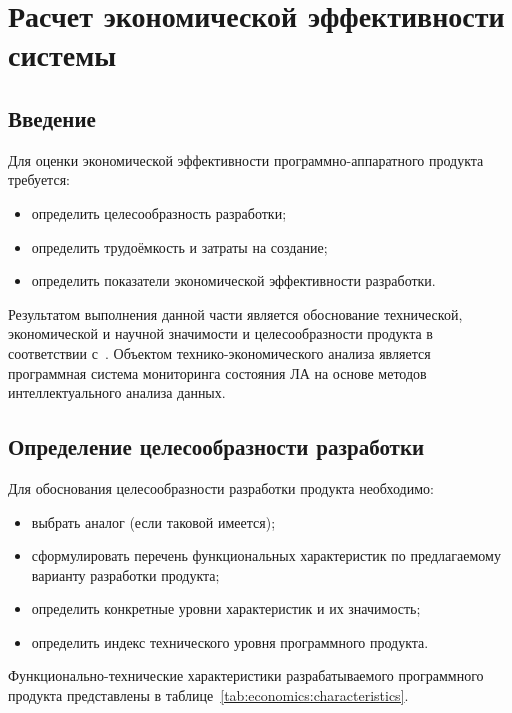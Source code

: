 \chapter{Расчет экономической эффективности системы}
\section{Введение}
Для оценки экономической эффективности программно-аппаратного продукта требуется:
\begin{itemize}
\item определить целесообразность разработки;
\item определить трудоёмкость и затраты на создание;
\item определить показатели экономической эффективности разработки.
\end{itemize}

Результатом выполнения данной части является обоснование технической, экономической и научной значимости и целесообразности продукта в соответствии с~\cite{EconomicsMethodic}. Объектом технико-экономического анализа является программная система мониторинга состояния ЛА на основе методов интеллектуального анализа данных.

\section{Определение целесообразности разработки}
Для обоснования целесообразности разработки продукта необходимо:
\begin{itemize}
\item выбрать аналог (если таковой имеется);
\item сформулировать перечень функциональных характеристик по предлагаемому варианту разработки продукта;
\item определить конкретные уровни характеристик и их значимость;
\item определить индекс технического уровня программного продукта.
\end{itemize}

Функционально-технические характеристики разрабатываемого программного продукта представлены в таблице~\ref{tab:economics:characteristics}.

